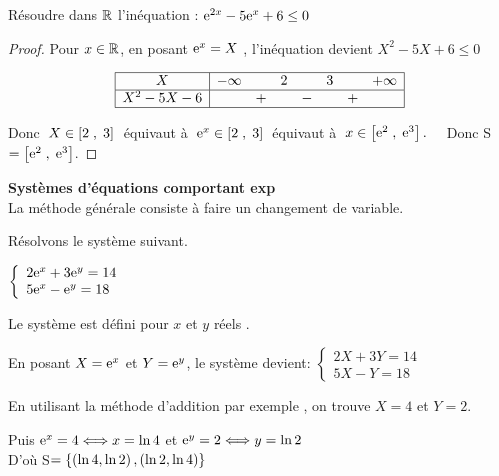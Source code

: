 \begin{example} Résoudre dans $ \mathbb{R} $ l'inéquation :\;  $\mathrm{e}^{2x}-5\mathrm{e}^{ x}+6\leq0 $
\end{example}
\begin{proof}

Pour $ x\in \mathbb{R} $, en posant   $\mathrm{e}^{x} =X $ ,\; l'inéquation  \; devient $ X^{2}- 5X+6\leq 0$

 
\[
\begin{array}{|c|ccccccc|}
\hline
X & -\infty &       & 2       &       & 3       &       & +\infty \\ 
\hline
X^2 - 5X - 6 &       & +       &       & -       &       & +     &  \\
\hline
\end{array}
\]

  
 Donc $\; X\in\left[2\;,\; 3\right]\;$ équivaut à $\;\mathrm{e}^{x} \in\left[2\;,\; 3\right] \;$ équivaut à $\;x \in\left[\mathrm{e}^{2}\;,\; \mathrm{e}^{3}\right].\quad  $ Donc S$ =\left[\mathrm{e}^{2}\;,\; \mathrm{e}^{3}\right] $.
\end{proof}
\textbf{Systèmes d'équations comportant exp}\\
La méthode générale consiste à faire un changement de variable.
\begin{example}
Résolvons le système suivant.

\medskip

$  \left\{\begin{array}{l} 2\mathrm{e}^{x}+3\mathrm{e}^{y}=14 \\ 5\mathrm{e}^{x}-\mathrm{e}^{y}=18\end{array}\right.$

Le système est défini pour $x$ et $y$ réels .

\medskip
En posant $X=\mathrm{e}^{x}  $ et $Y=\mathrm{e}^{y} $,  le système devient:
\quad   $  \left\{\begin{array}{l} 2X+3Y=14 \\ 5X-Y=18\end{array}\right.$

\medskip

En utilisant la méthode d'addition par exemple , on trouve $X=4 $ et $Y=2 $.

\medskip
Puis $\mathrm{e}^{x}=4 \Longleftrightarrow  x=\ln 4 $  et $\mathrm{e}^{y}=2 \Longleftrightarrow  y=\ln 2 $ \\

D'où S$ =\left\{\left(\ln 4,\ln 2\right),\left(\ln 2,\ln 4\right)\right\} $

\end{example}
